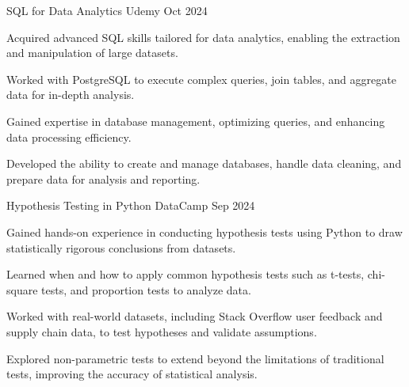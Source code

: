 
\begin{cventries}
	
	\cventry
	{SQL for Data Analytics} %
	{Udemy} %
	{\textcolor{neutraltext}{Oct 2024}} %
	{} %
	{
		\begin{cvitems} %
			\item Acquired advanced SQL skills tailored for data analytics, enabling the extraction and manipulation of large datasets.
			\item Worked with PostgreSQL to execute complex queries, join tables, and aggregate data for in-depth analysis.
			\item Gained expertise in database management, optimizing queries, and enhancing data processing efficiency.
			\item Developed the ability to create and manage databases, handle data cleaning, and prepare data for analysis and reporting.
		\end{cvitems}
	}
	
	
	
	\cventry
	{Hypothesis Testing in Python} %
	{DataCamp} %
	{\textcolor{neutraltext}{Sep 2024}} %
	{} %
	{
		\begin{cvitems} %
			\item Gained hands-on experience in conducting hypothesis tests using Python to draw statistically rigorous conclusions from datasets.
			\item Learned when and how to apply common hypothesis tests such as t-tests, chi-square tests, and proportion tests to analyze data.
			\item Worked with real-world datasets, including Stack Overflow user feedback and supply chain data, to test hypotheses and validate assumptions.
			\item Explored non-parametric tests to extend beyond the limitations of traditional tests, improving the accuracy of statistical analysis.
		\end{cvitems}
	}
	

\end{cventries}
